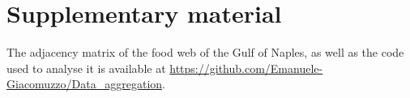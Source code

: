 \section*{Supplementary material}

	The adjacency matrix of the food web of the Gulf of Naples, as well as the code used to analyse it is available at \url{https://github.com/Emanuele-Giacomuzzo/Data_aggregation}.
